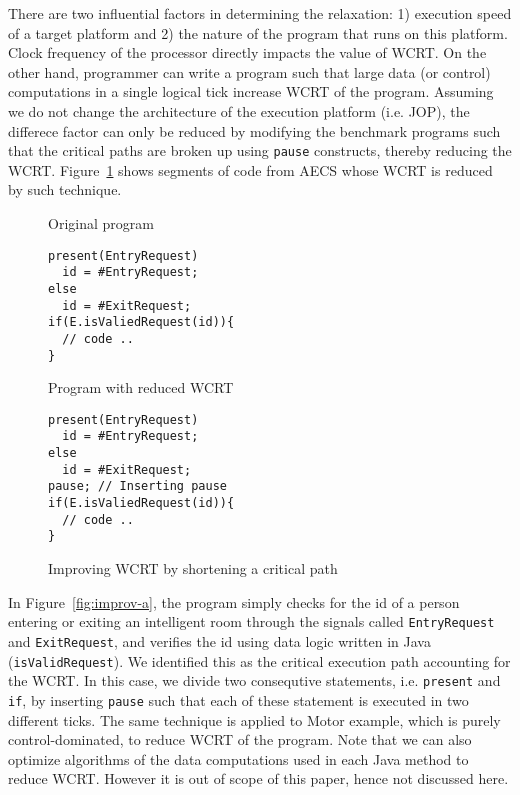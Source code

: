 There are two influential factors in determining the relaxation: 1)
execution speed of a target platform and 2) the nature of the program
that runs on this platform. Clock frequency of the processor directly
impacts the value of WCRT. On the other hand, programmer can write a
program such that large data (or control) computations in a single
logical tick increase WCRT of the program.  Assuming we do not change
the architecture of the execution platform (i.e. JOP), the differece
factor can only be reduced by modifying the benchmark programs such that
the critical paths are broken up using \texttt{pause} constructs,
thereby reducing the WCRT.  Figure~\ref{fig:improv} shows segments of
code from AECS whose WCRT is reduced by such technique.

\begin{figure}[h!]
	\centering
	\vspace{-10pt}
	\begin{SubFloat}{\label{fig:improv-a}Original program}
    \begin{minipage}[b]{0.45\linewidth}
		\begin{lstlisting}[style=sysj,morekeywords={present,emit,trap,pause,exit,delay,suspend}]
present(EntryRequest)
  id = #EntryRequest;
else
  id = #ExitRequest;
if(E.isValiedRequest(id)){
  // code ..
}
\end{lstlisting}
\end{minipage}
\end{SubFloat}
  \begin{SubFloat}{\label{fig:improv-b}Program with reduced WCRT}
    \centering
    \begin{minipage}[b]{0.45\linewidth}
		\begin{lstlisting}[style=sysj,morekeywords={emit,present,trap,pause,exit,delay,suspend}]
present(EntryRequest)
  id = #EntryRequest;
else
  id = #ExitRequest;
pause; // Inserting pause
if(E.isValiedRequest(id)){
  // code ..
}
\end{lstlisting}
		\end{minipage}
	\end{SubFloat}
	\caption{Improving WCRT by shortening a critical path}
	\label{fig:improv}
	\vspace{-10pt}
\end{figure}

In Figure~\ref{fig:improv-a}, the program simply checks for the id of a
person entering or exiting an intelligent room through the signals
called \texttt{EntryRequest} and \texttt{ExitRequest}, and verifies the
id using data logic written in Java (\texttt{isValidRequest}). We
identified this as the critical execution path accounting for the WCRT.
In this case, we divide two consequtive statements, i.e.
\texttt{present} and \texttt{if}, by inserting \texttt{pause} such that
each of these statement is executed in two different ticks. The same
technique is applied to Motor example, which is purely
control-dominated, to reduce WCRT of the program. Note that we can also
optimize algorithms of the data computations used in each Java method to
reduce WCRT. However it is out of scope of this paper, hence not
discussed here.

